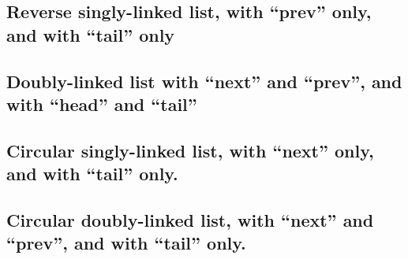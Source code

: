 \documentclass{article}
\begin{document}
\subsection{Reverse singly-linked list, with “prev” only, and with “tail” only}
\subsection{Doubly-linked list with “next” and “prev”, and with “head” and “tail”}
\subsection{Circular singly-linked list, with “next” only, and with “tail” only.}
\subsection{Circular doubly-linked list, with “next” and “prev”, and with “tail” only.}
\end{document}
